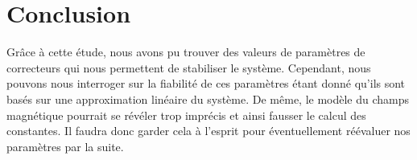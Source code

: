 \documentclass[11pt, french]{article} %
\begin{document}
\section{Conclusion}

Grâce à cette étude, nous avons pu trouver des valeurs de paramètres de correcteurs qui nous permettent de stabiliser le système. Cependant, nous pouvons nous interroger sur la fiabilité de ces paramètres étant donné qu'ils sont basés sur une approximation linéaire du système. De même, le modèle du champs magnétique pourrait se révéler trop imprécis et ainsi fausser le calcul des constantes. Il faudra donc garder cela à l'esprit pour éventuellement réévaluer nos paramètres par la suite. 
\end{document}
